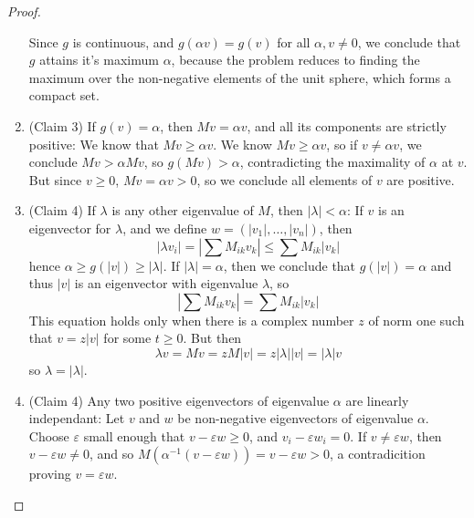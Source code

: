 \begin{proof}
\begin{enumerate}
        Since $g$ is continuous, and $g(\alpha v) = g(v)$ for all $\alpha, v \neq 0$, we conclude that $g$ attains it's maximum $\alpha$, because the problem reduces to finding the maximum over the non-negative elements of the unit sphere, which forms a compact set.

        \item (Claim 3) If $g(v) = \alpha$, then $Mv = \alpha v$, and all its components are strictly positive: We know that $Mv \geq \alpha v$. We know $Mv \geq \alpha v$, so if $v \neq \alpha v$, we conclude $Mv > \alpha Mv$, so $g(Mv) > \alpha$, contradicting the maximality of $\alpha$ at $v$. But since $v \geq 0$, $Mv = \alpha v > 0$, so we conclude all elements of $v$ are positive.

        \item (Claim 4) If $\lambda$ is any other eigenvalue of $M$, then $|\lambda| < \alpha$: If $v$ is an eigenvector for $\lambda$, and we define $w = (|v_1|, \dots, |v_n|)$, then
        \[ |\lambda v_i| = \left| \sum M_{ik} v_k \right| \leq \sum M_{ik} |v_k| \]
        hence $\alpha \geq g(|v|) \geq |\lambda|$. If $|\lambda| = \alpha$, then we conclude that $g(|v|) = \alpha$ and thus $|v|$ is an eigenvector with eigenvalue $\lambda$, so
        \[ \left| \sum M_{ik} v_k \right| = \sum M_{ik} |v_k| \]
        This equation holds only when there is a complex number $z$ of norm one such that $v = z|v|$ for some $t \geq 0$. But then
        \[ \lambda v = Mv = zM|v| = z|\lambda||v| = |\lambda| v \]
        so $\lambda = |\lambda|$.

        \item (Claim 4) Any two positive eigenvectors of eigenvalue $\alpha$ are linearly independant: Let $v$ and $w$ be non-negative eigenvectors of eigenvalue $\alpha$. Choose $\varepsilon$ small enough that $v - \varepsilon w \geq 0$, and $v_i - \varepsilon w_i = 0$. If $v \neq \varepsilon w$, then $v - \varepsilon w \neq 0$, and so $M(\alpha^{-1}(v - \varepsilon w)) = v - \varepsilon w > 0$, a contradicition proving $v = \varepsilon w$.


\end{enumerate}
\end{proof}
